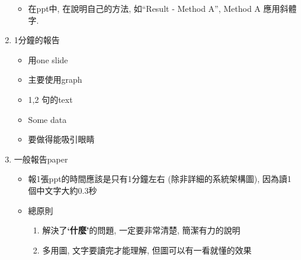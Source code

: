 \begin{enumerate}
{\begin{itemize}
      \item
      {
        在ppt中, 在說明自己的方法, 如``Result - Method A'', Method A 應用斜體字.
      } %

    \end{itemize}
  } %

  \item
  {
      1分鐘的報告
    \begin{itemize}
      \item
      {
        用one slide
      } %

      \item
      {
        主要使用graph
      } %

      \item
      {
        1,2 句的text
      } %

      \item
      {
        Some data
      } %

      \item
      {
        要做得能吸引眼睛
      } %
    \end{itemize}
  } %

  \item
  {
    一般報告paper
    \begin{itemize}
      \item
      {
        報1張ppt的時間應該是只有1分鐘左右 (除非詳細的系統架構圖), 因為讀1個中文字大約0.3秒
      } %

      \item
      {
        總原則
        \begin{enumerate}
          \item
          {
            解決了\textbf{`什麼'}的問題, 一定要非常清楚, 簡潔有力的說明
          } %

          \item
          {
            多用圖, 文字要讀完才能理解, 但圖可以有一看就懂的效果
          } %
        \end{enumerate}
      } %


\end{itemize}}
\end{enumerate}
